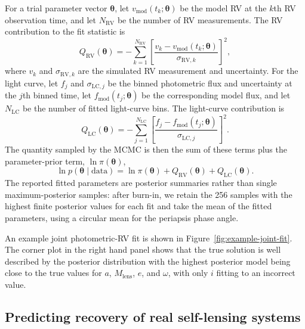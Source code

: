 \documentclass[fleqn,usenatbib]{mnras}
\begin{document}
For a trial parameter vector $\boldsymbol{\theta}$, let $v_\mathrm{mod}(t_k;\boldsymbol{\theta})$ be the model RV at the $k$th RV observation time, and let $N_\mathrm{RV}$ be the number of RV measurements. The RV contribution to the fit statistic is
\begin{equation}
    Q_\mathrm{RV}(\boldsymbol{\theta}) =
    -\sum_{k=1}^{N_\mathrm{RV}}
    \left[
        \frac{v_k - v_\mathrm{mod}(t_k;\boldsymbol{\theta})}
        {\sigma_{\mathrm{RV},k}}
        \right]^2,
\end{equation}
where $v_k$ and $\sigma_{\mathrm{RV},k}$ are the simulated RV measurement and uncertainty. For the light curve, let $f_j$ and $\sigma_{\mathrm{LC},j}$ be the binned photometric flux and uncertainty at the $j$th binned time, let $f_\mathrm{mod}(t_j;\boldsymbol{\theta})$ be the corresponding model flux, and let $N_\mathrm{LC}$ be the number of fitted light-curve bins. The light-curve contribution is
\begin{equation}
    Q_\mathrm{LC}(\boldsymbol{\theta}) =
    -\sum_{j=1}^{N_\mathrm{LC}}
    \left[
        \frac{f_j - f_\mathrm{mod}(t_j;\boldsymbol{\theta})}
        {\sigma_{\mathrm{LC},j}}
        \right]^2.
\end{equation}
The quantity sampled by the MCMC is then the sum of these terms plus the parameter-prior term, $\ln \pi(\boldsymbol{\theta})$,
\begin{equation}
    \ln p(\boldsymbol{\theta}\mid\mathrm{data}) =
    \ln \pi(\boldsymbol{\theta}) +
    Q_\mathrm{RV}(\boldsymbol{\theta}) +
    Q_\mathrm{LC}(\boldsymbol{\theta}).
\end{equation}
The reported fitted parameters are posterior summaries rather than single maximum-posterior samples: after burn-in, we retain the 256 samples with the highest finite posterior values for each fit and take the mean of the fitted parameters, using a circular mean for the periapsis phase angle.

An example joint photometric-RV fit is shown in Figure~\ref{fig:example-joint-fit}. The corner plot in the right hand panel shows that the true solution is well described by the posterior distribution with the highest posterior model being close to the true values for $a$, $M_\mathrm{lens}$, $e$, and $\omega$, with only $i$ fitting to an incorrect value.

\subsection{Predicting recovery of real self-lensing systems} \label{sec:pop-synth}
\end{document}
